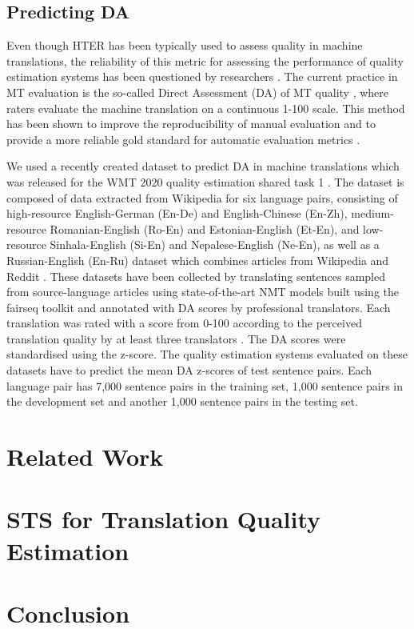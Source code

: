 \subsection{Predicting DA}
Even though HTER has been typically used to assess quality in machine translations, the reliability of this metric for assessing the performance of quality estimation systems has been questioned by researchers \cite{graham-etal-2016-glitters}. The current practice in MT evaluation is the so-called Direct Assessment (DA) of MT quality \cite{graham_baldwin_moffat_zobel_2017}, where raters evaluate the machine translation on a continuous 1-100 scale. This method has been shown to improve the reproducibility of manual evaluation and to provide a more reliable gold standard for automatic evaluation metrics \cite{graham-etal-2015-accurate}. 

We used a recently created dataset to predict DA in machine translations which was released for the WMT 2020 quality estimation shared task 1 \cite{specia-etal-2020-findings-wmt}. The dataset is composed of data extracted from Wikipedia for six language pairs, consisting of high-resource English-German (En-De) and English-Chinese (En-Zh), medium-resource Romanian-English (Ro-En) and Estonian-English (Et-En), and low-resource Sinhala-English (Si-En) and Nepalese-English (Ne-En), as well as a Russian-English (En-Ru) dataset which combines articles from Wikipedia and Reddit \cite{fomicheva-etal-2020-unsupervised}. These datasets have been collected by translating sentences sampled from source-language articles using state-of-the-art NMT models built using the fairseq toolkit \cite{ott-etal-2019-fairseq} and annotated with DA scores by professional translators. Each translation was rated with a score from 0-100 according to the perceived translation quality by at least three translators \cite{specia-etal-2020-findings-wmt}. The DA scores were standardised using the z-score. The quality estimation systems evaluated on these datasets have to predict the mean DA z-scores of test sentence pairs. Each language pair has 7,000 sentence pairs in the training set, 1,000 sentence pairs in the development set and another 1,000 sentence pairs in the testing set. 

\section{Related Work}
\cite{kepler-etal-2019-openkiwi}
\section{STS for Translation Quality Estimation}

\section{Conclusion}

